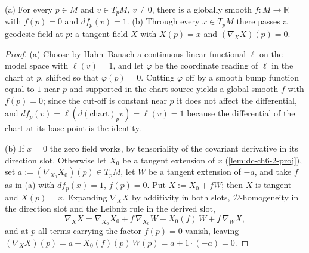 \begin{lemma}
  \label{lem:dc-ch6-2-9-existence}


  (a) For every $p\in\overline{M}$ and $v\in T_p\overline{M}$, $v\neq0$, there is a
  globally smooth $f:\overline{M}\to\mathbb{R}$ with $f(p)=0$ and $df_p(v)=1$.
  (b) Through every $x\in T_pM$ there passes a geodesic field at $p$: a tangent
  field $X$ with $X(p)=x$ and $(\nabla_X X)(p)=0$.
\end{lemma}
\begin{proof}

  \sketch
  (a) Choose by Hahn--Banach a continuous linear functional $\ell$ on the model
  space with $\ell(v)=1$, and let $\varphi$ be the coordinate reading of $\ell$
  in the chart at $p$, shifted so that $\varphi(p)=0$. Cutting $\varphi$ off by
  a smooth bump function equal to $1$ near $p$ and supported in the chart source
  yields a global smooth $f$ with $f(p)=0$; since the cut-off is constant near
  $p$ it does not affect the differential, and $df_p(v)=\ell(d(\mathrm{chart})_p
  v)=\ell(v)=1$ because the differential of the chart at its base point is the
  identity.

  (b) If $x=0$ the zero field works, by tensoriality of the covariant derivative
  in its direction slot. Otherwise let $X_0$ be a tangent extension of $x$
  (\cref{lem:dc-ch6-2-proj}), set $a:=(\nabla_{X_0}X_0)(p)\in T_pM$, let $W$ be a
  tangent extension of $-a$, and take $f$ as in (a) with $df_p(x)=1$, $f(p)=0$.
  Put $X:=X_0+fW$; then $X$ is tangent and $X(p)=x$. Expanding
  $\nabla_{X}X$ by additivity in both slots, $\mathcal{D}$-homogeneity in the
  direction slot and the Leibniz rule in the derived slot,
  $$
  \nabla_X X=\nabla_{X_0}X_0+f\,\nabla_{X_0}W+X_0(f)\,W+f\,\nabla_{W}X ,
  $$
  and at $p$ all terms carrying the factor $f(p)=0$ vanish, leaving
  $(\nabla_XX)(p)=a+X_0(f)(p)\,W(p)=a+1\cdot(-a)=0$.
\end{proof}

